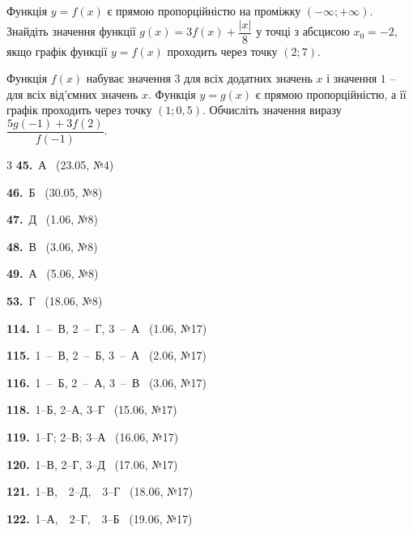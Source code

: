 \documentclass[12pt]{article}
\begin{document}

\begin{samepage}
\noindent\zadnum Функція $y=f(x)$ є прямою пропорційністю на проміжку $(-\infty; +\infty)$. Знайдіть значення функції $g(x) = 3f(x) + \dfrac{|x|}{8}$ у точці з абсцисою $x_0 = -2$, якщо графік функції $y=f(x)$ проходить через точку $(2; 7)$. 
\nmtAnswerBox
\par{}
\end{samepage}

\begin{samepage}
\noindent\zadnum Функція $f(x)$ набуває значення $3$ для всіх додатних значень $x$ і значення $1$ -- для всіх від'ємних значень $x$. Функція $y=g(x)$ є прямою пропорційністю, а її графік проходить через точку $(1; 0{,}5)$. Обчисліть значення виразу $\dfrac{5g(-1)+3f(2)}{f(-1)}$. 
\nmtAnswerBox
\par{}
\end{samepage}

\ifshowsolutions
{}
\begin{multicols}{3}\noindent
\noindent\textbf{45.}~А \ {\scriptsize\color{gray}(23.05, №4)}\par
\noindent\textbf{46.}~Б \ {\scriptsize\color{gray}(30.05, №8)}\par
\noindent\textbf{47.}~Д \ {\scriptsize\color{gray}(1.06, №8)}\par
\noindent\textbf{48.}~В \ {\scriptsize\color{gray}(3.06, №8)}\par
\noindent\textbf{49.}~А \ {\scriptsize\color{gray}(5.06, №8)}\par
\noindent\textbf{53.}~Г \ {\scriptsize\color{gray}(18.06, №8)}\par
\noindent\textbf{114.}~1~--~В, 2~--~Г, 3~--~А \ {\scriptsize\color{gray}(1.06, №17)}\par
\noindent\textbf{115.}~1~--~В, 2~--~Б, 3~--~А \ {\scriptsize\color{gray}(2.06, №17)}\par
\noindent\textbf{116.}~1~--~Б, 2~--~А, 3~--~В \ {\scriptsize\color{gray}(3.06, №17)}\par
\noindent\textbf{118.}~1--Б, 2--А, 3--Г \ {\scriptsize\color{gray}(15.06, №17)}\par
\noindent\textbf{119.}~1--Г; 2--В; 3--А \ {\scriptsize\color{gray}(16.06, №17)}\par
\noindent\textbf{120.}~1--В, 2--Г, 3--Д \ {\scriptsize\color{gray}(17.06, №17)}\par
\noindent\textbf{121.}~1--В,\ \ 2--Д,\ \ 3--Г \ {\scriptsize\color{gray}(18.06, №17)}\par
\noindent\textbf{122.}~1--А,\ \ 2--Г,\ \ 3--Б \ {\scriptsize\color{gray}(19.06, №17)}\par
\end{multicols}
\fi

\endgroup
\end{document}
